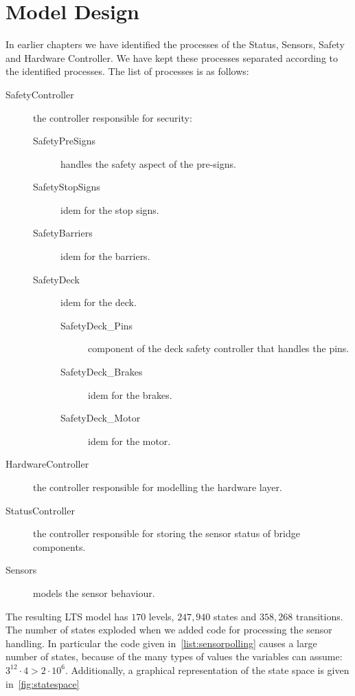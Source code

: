 \chapter{Model Design}	\label{chap:model}
	In earlier chapters we have identified the processes of the Status, Sensors, Safety and Hardware Controller.
	We have kept these processes separated according to the identified processes.
	The list of processes is as follows:
	\begin{description}
		\item[SafetyController] the controller responsible for security:
			\begin{description}
				\item[SafetyPreSigns] handles the safety aspect of the pre-signs.
				\item[SafetyStopSigns] idem for the stop signs.
				\item[SafetyBarriers] idem for the barriers.
				\item[SafetyDeck] idem for the deck.
					\begin{description}
						\item[SafetyDeck\_Pins] component of the deck safety controller that handles the pins.
						\item[SafetyDeck\_Brakes] idem for the brakes.
						\item[SafetyDeck\_Motor] idem for the motor.
					\end{description}
			\end{description}
		\item[HardwareController] the controller responsible for modelling the hardware layer.
		\item[StatusController] the controller responsible for storing the sensor status of bridge components.
		\item[Sensors] models the sensor behaviour. 
	\end{description}



	The resulting LTS model has $170$ levels, $247,940$ states and $358,268$ transitions.
	The number of states exploded when we added code for processing the sensor handling.
	In particular the code given in~\cref{list:sensorpolling} causes a large number of states,
	because of the many types of values the variables can assume: $3^{12}\cdot4 > 2\cdot 10^6$.
	Additionally, a graphical representation of the state space is given in~\cref{fig:statespace}

	

